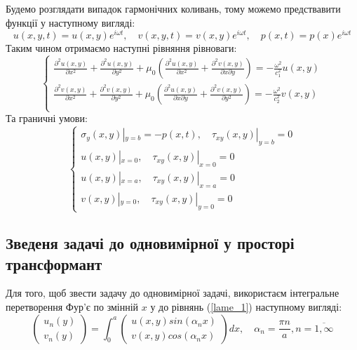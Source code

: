 Будемо розглядати випадок гармонічних коливань, тому можемо предствавити функції у наступному вигляді:
\begin{equation}
    u(x,y,t) = u(x,y) e^{i \omega t}, \quad v(x,y,t) = v(x,y) e^{i \omega t}, \quad p(x,t) = p(x) e^{i \omega t}
\end{equation}
Таким чином отримаємо наступні рівняння рівноваги:
\begin{equation}\label{lame_2}
    \begin{cases}
        \frac{\partial^2 u(x,y)}{\partial x^2} + \frac{\partial^2 u(x,y)}{\partial y^2} + \mu_0 (\frac{\partial^2 u(x,y)}{\partial x^2} + \frac{\partial^2 v(x,y)}{\partial x\partial y}) = -\frac{\omega^2}{c_1^2}  u(x,y) \\
        \frac{\partial^2 v(x,y)}{\partial x^2} + \frac{\partial^2 v(x,y)}{\partial y^2} + \mu_0 (\frac{\partial^2 u(x,y)}{\partial x \partial y} + \frac{\partial^2 v(x,y)}{\partial y^2}) = -\frac{\omega^2}{c_2^2} v(x,y) \\
    \end{cases}
\end{equation}
Та граничні умови:
\begin{equation}\label{bound_2}
    \begin{cases}
        \sigma_y(x, y) |_{y=b} = -p(x, t), \quad  \tau_{xy}(x,y) |_{y=b} =0 \\
        u(x,y) |_{x=0}, \quad \tau_{xy}(x,y) |_{x=0} =0 \\
        u(x,y) |_{x=a}, \quad \tau_{xy}(x,y) |_{x=a} =0 \\
        v(x,y) |_{y=0}, \quad \tau_{xy}(x,y) |_{y=0} =0
    \end{cases}
\end{equation}

\subsection{Зведеня задачі до одновимірної у просторі трансформант}
Для того, щоб звести задачу до одновимірної задачі, використаєм інтегральне перетворення Фур'є по змінній $x$ у до рівнянь (\ref{lame_1}) наступному вигляді:
\begin{equation}
    \begin{pmatrix}
        u_n(y) \\
        v_n(y)
    \end{pmatrix} = \int_{0}^{a} 
    \begin{pmatrix}
        u(x,y) sin(\alpha_n x) \\
        v(x,y) cos(\alpha_n x)
    \end{pmatrix} dx, \quad \alpha_n = \frac{\pi n}{a}, n=\overline{1, \infty}
\end{equation}

